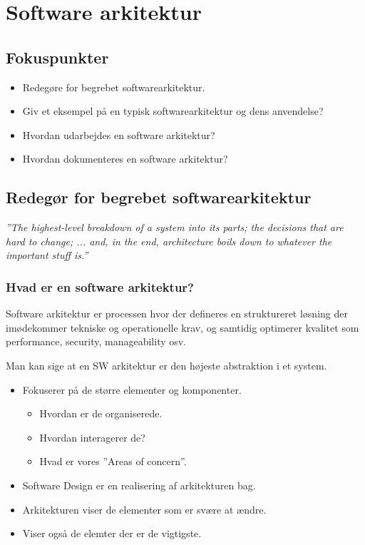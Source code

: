 \section{Software arkitektur}

\subsection{Fokuspunkter}

\begin{itemize}
	\item Redegøre for begrebet softwarearkitektur.
	\item Giv et eksempel på en typisk softwarearkitektur og dens anvendelse?
	\item Hvordan udarbejdes en software arkitektur?
	\item Hvordan dokumenteres en software arkitektur?
\end{itemize}

\subsection{Redegør for begrebet softwarearkitektur}
\textit{''The highest-level breakdown of a system into its parts; the decisions that are hard to change; ...  and, in the end, architecture boils down to whatever the important stuff is.''}

\subsubsection{Hvad er en software arkitektur?}
Software arkitektur er processen hvor der defineres en struktureret løsning der imødekommer tekniske og operationelle krav, og samtidig optimerer kvalitet som performance, security, manageability osv.

Man kan sige at en SW arkitektur er den højeste abstraktion i et system.

\begin{itemize}
	\item Fokuserer på de større elementer og komponenter.
	\begin{itemize}
		\item Hvordan er de organiserede.
		\item Hvordan interagerer de?
		\item Hvad er vores ''Areas of concern''.
	\end{itemize}
	\item Software Design er en realisering af arkitekturen bag.
	\item Arkitekturen viser de elementer som er svære at ændre.
	\item Viser også de elemter der er de vigtigste.
\end{itemize}

